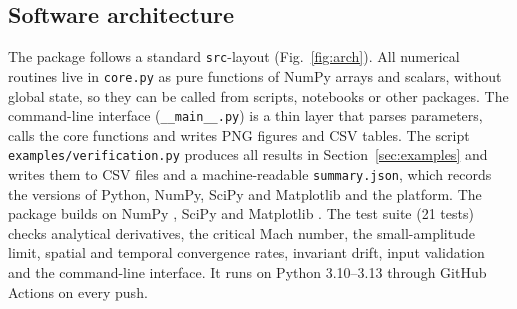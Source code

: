 \documentclass[preprint,12pt]{elsarticle}
\begin{document}
\subsection{Software architecture}
\label{sec:architecture}

The package follows a standard \texttt{src}-layout (Fig.~\ref{fig:arch}). All
numerical routines live in \texttt{core.py} as pure functions of NumPy arrays
and scalars, without global state, so they can be called from scripts, notebooks
or other packages. The command-line interface (\texttt{\_\_main\_\_.py}) is a
thin layer that parses parameters, calls the core functions and writes PNG
figures and CSV tables. The script \texttt{examples/verification.py} produces
all results in Section~\ref{sec:examples} and writes them to CSV files and a
machine-readable \texttt{summary.json}, which records the versions of Python, NumPy, SciPy and
Matplotlib and the platform. The package builds on NumPy \cite{Harris2020}, SciPy
\cite{Virtanen2020} and Matplotlib \cite{Hunter2007}. The test suite (21 tests) checks analytical derivatives, the critical
Mach number, the small-amplitude limit, spatial and temporal convergence rates,
invariant drift, input validation and the command-line interface. It runs on
Python 3.10--3.13 through GitHub Actions on every push.
\end{document}
